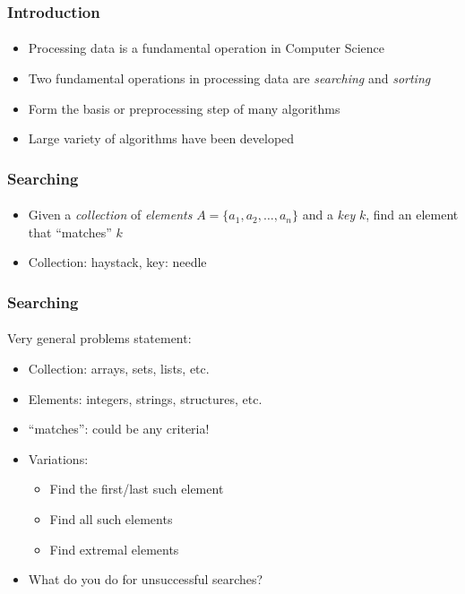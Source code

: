 \documentclass[]{beamer}
\begin{document}
\begin{frame}[fragile]
  \frametitle{Introduction}
  \framesubtitle{}

\begin{itemize}[<+->]
  \item Processing data is a fundamental operation in Computer Science
  \item Two fundamental operations in processing data are \emph{searching} 
   and \emph{sorting}
  \item Form the basis or preprocessing step of many algorithms
  \item Large variety of algorithms have been developed
\end{itemize}

\end{frame}

\begin{frame}[fragile]
  \frametitle{Searching}
  \framesubtitle{}

\begin{itemize}[<+->]
  \item Given a \emph{collection} of \emph{elements} 
  $A = \{a_1, a_2, \ldots, a_n\}$ and a \emph{key} $k$, find an element 
  that ``matches'' $k$
  \item Collection: haystack, key: needle
\end{itemize}

\end{frame}

\begin{frame}[fragile]
  \frametitle{Searching}
  \framesubtitle{}

Very general problems statement:
\begin{itemize}[<+->]
  \item Collection: arrays, sets, lists, etc.
  \item Elements: integers, strings, structures, etc.
  \item ``matches'': could be any criteria!
  \item Variations:
  \begin{itemize}
    \item Find the first/last such element
    \item Find all such elements
    \item Find extremal elements
  \end{itemize}
  \item What do you do for unsuccessful searches?
\end{itemize}

\end{frame}
\end{document}
